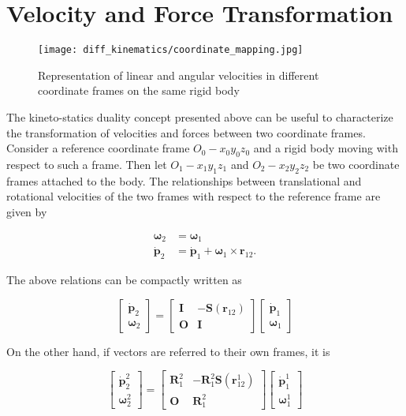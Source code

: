 \documentclass[10pt]{article}
\begin{document}
\section{Velocity and Force Transformation}

\begin{figure}[H]
    \centering
    \texttt{[image: diff\_kinematics/coordinate\_mapping.jpg]}
    \caption{Representation of linear and angular velocities in different coordinate frames on the same rigid body}
    \label{fig:enter-label}
\end{figure}


The kineto-statics duality concept presented above can be useful to characterize the transformation of velocities and forces between two coordinate frames. Consider a reference coordinate frame $O_{0}-x_{0} y_{0} z_{0}$ and a rigid body moving with respect to such a frame. Then let $O_{1}-x_{1} y_{1} z_{1}$ and $O_{2}-x_{2} y_{2} z_{2}$ be two coordinate frames attached to the body. The relationships between translational and rotational velocities of the two frames with respect to the reference frame are given by

$$
\begin{aligned}
\boldsymbol{\omega}_{2} & =\boldsymbol{\omega}_{1} \\
\dot{\boldsymbol{p}}_{2} & =\dot{\boldsymbol{p}}_{1}+\boldsymbol{\omega}_{1} \times \boldsymbol{r}_{12} .
\end{aligned}
$$

The above relations can be compactly written as

$$
\left[\begin{array}{c}
\dot{\boldsymbol{p}}_{2} \\
\boldsymbol{\omega}_{2}
\end{array}\right]=\left[\begin{array}{cc}
\boldsymbol{I} & -\boldsymbol{S}\left(\boldsymbol{r}_{12}\right) \\
\boldsymbol{O} & \boldsymbol{I}
\end{array}\right]\left[\begin{array}{c}
\dot{\boldsymbol{p}}_{1} \\
\boldsymbol{\omega}_{1}
\end{array}\right]
$$

On the other hand, if vectors are referred to their own frames, it is

$$
\left[\begin{array}{c}
\dot{\boldsymbol{p}}_{2}^{2} \\
\boldsymbol{\omega}_{2}^{2}
\end{array}\right]=\left[\begin{array}{cc}
\boldsymbol{R}_{1}^{2} & -\boldsymbol{R}_{1}^{2} \boldsymbol{S}\left(\boldsymbol{r}_{12}^{1}\right) \\
\boldsymbol{O} & \boldsymbol{R}_{1}^{2}
\end{array}\right]\left[\begin{array}{c}
\dot{\boldsymbol{p}}_{1}^{1} \\
\boldsymbol{\omega}_{1}^{1}
\end{array}\right]
$$
\end{document}
